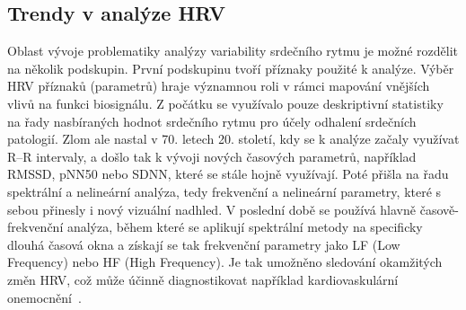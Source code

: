 \subsection{Trendy v analýze HRV}
\label{subsec:hrv_analysis_trends}
Oblast vývoje problematiky analýzy variability srdečního rytmu je možné rozdělit
na několik podskupin. První podskupinu tvoří příznaky použité k analýze. Výběr
\gls{HRV} příznaků (parametrů) hraje významnou roli v rámci mapování vnějších
vlivů na funkci biosignálu. Z počátku se využívalo pouze deskriptivní statistiky
na řady nasbíraných hodnot srdečního rytmu pro účely odhalení srdečních
patologií. Zlom ale nastal v 70. letech 20. století, kdy se k analýze začaly
využívat R--R intervaly, a došlo tak k vývoji nových časových parametrů,
například \gls{RMSSD}, pNN50 nebo SDNN, které se stále hojně využívají. Poté
přišla na řadu spektrální a nelineární analýza, tedy frekvenční a nelineární
parametry, které s sebou přinesly i nový vizuální nadhled. V poslední době se
používá hlavně časově-frekvenční analýza, během které se aplikují spektrální
metody na specificky dlouhá časová okna a získají se tak frekvenční parametry
jako LF (Low Frequency) nebo HF (High Frequency). Je tak umožněno sledování
okamžitých změn \gls{HRV}, což může účinně diagnostikovat například
kardiovaskulární onemocnění~\cite{Shaffer2014,Ishaque2021}.

